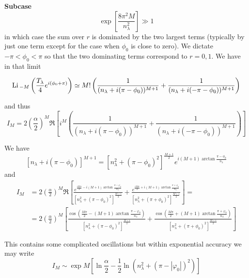 \textbf{Subcase}
\[
\exp\left[\frac{8\pi^{2}M}{n_{\lambda}^{2}}\right]\gg1
\]
in which case the sum over $r$ is dominated by the two largest terms
(typically by just one term except for the case when $\phi_{0}$ is
close to zero). We dictate $-\pi<\phi_{0}<\pi$ so that the two dominating
terms correspond to $r=0,1$. We have in that limit

\[
\mathrm{Li}\,_{-M}\left(\frac{T_{\lambda}}{4}e^{i(\phi_{0}+\pi)}\right)\simeq M!\left(\frac{1}{(n_{\lambda}+i(\pi-\phi_{0}))^{M+1}}+\frac{1}{(n_{\lambda}+i(-\pi-\phi_{0}))^{M+1}}\right)
\]

and thus 
\[
I_{M}=2\left(\frac{\alpha}{2}\right)^{M}\Re\left[i^{M}\left(\frac{1}{(n_{\lambda}+i(\pi-\phi_{0}))^{M+1}}+\frac{1}{(n_{\lambda}+i(-\pi-\phi_{0}))^{M+1}}\right)\right]
\]

We have 
\[
[n_{\lambda}+i(\pi-\phi_{0})]^{M+1}=\left[n_{\lambda}^{2}+(\pi-\phi_{0})^{2}\right]^{\frac{M+1}{2}}e^{i(M+1)\arctan\frac{\pi-\phi_{0}}{n_{\lambda}}}
\]
and 
\begin{align*}
I_{M} & =2\left(\frac{\alpha}{2}\right)^{M}\Re\left[\frac{e^{\frac{iM\pi}{2}-i(M+1)\arctan\frac{\pi-\varphi_{0}}{n_{\lambda}}}}{\left[n_{\lambda}^{2}+(\pi-\phi_{0})^{2}\right]^{\frac{M+1}{2}}}+\frac{e^{\frac{iM\pi}{2}+i(M+1)\arctan\frac{\pi+\varphi_{0}}{n_{\lambda}}}}{\left[n_{\lambda}^{2}+(\pi+\phi_{0})^{2}\right]^{\frac{M+1}{2}}}\right]=\\
& =2\left(\frac{\alpha}{2}\right)^{M}\left[\frac{\cos\left(\frac{M\pi}{2}-(M+1)\arctan\frac{\pi-\varphi_{0}}{n_{\lambda}}\right)}{\left[n_{\lambda}^{2}+(\pi-\phi_{0})^{2}\right]^{\frac{M+1}{2}}}+\frac{\cos\left(\frac{M\pi}{2}+(M+1)\arctan\frac{\pi+\varphi_{0}}{n_{\lambda}}\right)}{\left[n_{\lambda}^{2}+(\pi+\phi_{0})^{2}\right]^{\frac{M+1}{2}}}\right]
\end{align*}

This contains some complicated oscillations but within exponential
accuracy we may write
\[
I_{M}\sim\exp M\left[\ln\frac{\alpha}{2}-\frac{1}{2}\ln(n_{\lambda}^{2}+(\pi-|\varphi_{0}|)^{2})\right]
\]

